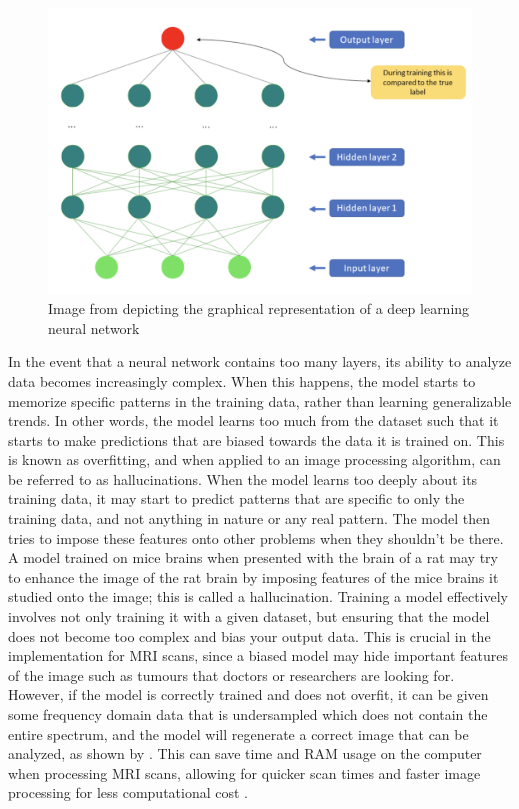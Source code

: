 \documentclass[14pt]{extreport}
\begin{document}
        \begin{figure}[h]
            \begin{center}
                \includegraphics[width = 0.6\linewidth]{Neural Network.png}
                \caption{Image from \cite{Lundervold_Lundervold_2019} depicting the graphical representation of a deep learning neural network}
            \end{center}
        \end{figure}

        In the event that a neural network contains too many layers, its ability to analyze data becomes increasingly complex. When this happens, the model starts to memorize specific patterns in the training data, rather than learning generalizable trends. In other words, the model learns too much from the dataset such that it starts to make predictions that are biased towards the data it is trained on. This is known as overfitting, and when applied to an image processing algorithm, can be referred to as hallucinations. When the model learns too deeply about its training data, it may start to predict patterns that are specific to only the training data, and not anything in nature or any real pattern. The model then tries to impose these features onto other problems when they shouldn't be there. A model trained on mice brains when presented with the brain of a rat may try to enhance the image of the rat brain by imposing features of the mice brains it studied onto the image; this is called a hallucination. Training a model effectively involves not only training it with a given dataset, but ensuring that the model does not become too complex and bias your output data. This is crucial in the implementation for MRI scans, since a biased model may hide important features of the image such as tumours that doctors or researchers are looking for. However, if the model is correctly trained and does not overfit, it can be given some frequency domain data that is undersampled which does not contain the entire spectrum, and the model will regenerate a correct image that can be analyzed, as shown by \cite{Hyun_Kim_Lee_Lee_Seo_2018}. This can save time and RAM usage on the computer when processing MRI scans, allowing for quicker scan times and faster image processing for less computational cost \cite{Hyun_Kim_Lee_Lee_Seo_2018}. 
\end{document}
